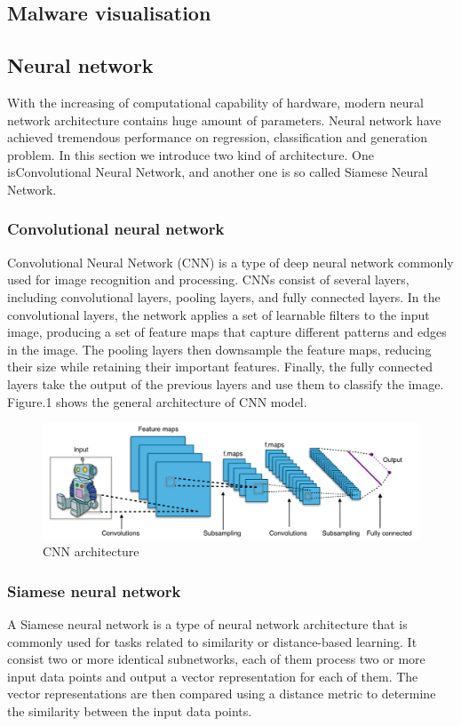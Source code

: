 \documentclass{article}
\begin{document}
\subsection{Malware visualisation}
\subsection{Neural network} 
With the increasing of computational capability of hardware, modern neural network architecture contains huge amount of parameters.
Neural network have achieved tremendous performance on regression, classification and generation problem.
In this section we introduce two kind of architecture. One isConvolutional Neural Network, and another one is so called Siamese Neural Network.
\subsubsection{Convolutional neural network}
Convolutional Neural Network (CNN) is a type of deep neural network commonly used for image recognition and processing. 
CNNs consist of several layers, including convolutional layers, pooling layers, and fully connected layers. In the convolutional layers, the network applies a set of learnable filters to the input image, 
producing a set of feature maps that capture different patterns and edges in the image. The pooling layers then downsample the feature maps, reducing their size while retaining their important features. Finally, 
the fully connected layers take the output of the previous layers and use them to classify the image. Figure.1 shows the general architecture of CNN model.
\begin{figure}
    \includegraphics[width=\textwidth]{fig/CNN.png}    
    \caption{CNN architecture}
\end{figure}
\subsubsection{Siamese neural network}
A Siamese neural network is a type of neural network architecture that is commonly used for tasks related to similarity or distance-based learning.
It consist two or more identical subnetworks, each of them process two or more input data points and output a vector representation for each of them. 
The vector representations are then compared using a distance metric to determine the similarity between the input data points.
\end{document}
